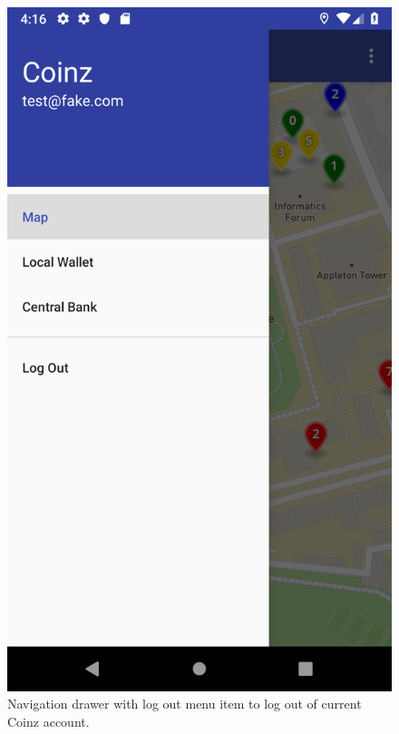 \documentclass[11pt,a4paper,notitlepage]{article}
\begin{document}
\begin{figure}[H]
    \centering
    \begin{minipage}[t]{0.48\textwidth}
        \includegraphics[scale=0.2]{screenshots/navigation-drawer/navigation-drawer-map-selected.png}
        \caption{Navigation drawer with log out menu item to log out of current Coinz account.}
    \end{minipage}
    \begin{minipage}[t]{0.48\textwidth}

\end{minipage}
\end{figure}
\end{document}
